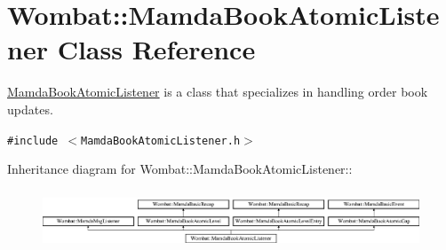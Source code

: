 \hypertarget{classWombat_1_1MamdaBookAtomicListener}{
\section{Wombat::Mamda\-Book\-Atomic\-Listener Class Reference}
\label{classWombat_1_1MamdaBookAtomicListener}
}
\hyperlink{classWombat_1_1MamdaBookAtomicListener}{Mamda\-Book\-Atomic\-Listener} is a class that specializes in handling order book updates.  


{\tt \#include $<$Mamda\-Book\-Atomic\-Listener.h$>$}

Inheritance diagram for Wombat::Mamda\-Book\-Atomic\-Listener::\begin{figure}[H]
\begin{center}
\leavevmode
\includegraphics[height=1.76471cm]{classWombat_1_1MamdaBookAtomicListener}
\end{center}
\end{figure}
